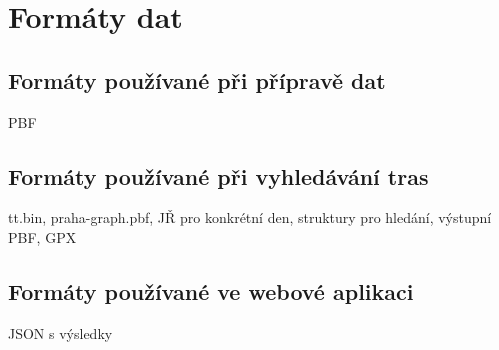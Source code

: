 \chapter{Formáty dat}
\section{Formáty používané při přípravě dat}
\TODO PBF
\section{Formáty používané při vyhledávání tras}
\TODO tt.bin, praha-graph.pbf, JŘ pro konkrétní den, struktury pro hledání,
výstupní PBF, GPX
\section{Formáty používané ve webové aplikaci}
\TODO JSON s výsledky
